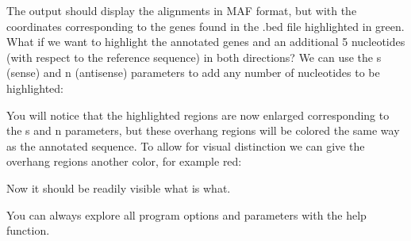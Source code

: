 \documentclass[letterpaper,10pt,english]{sphinxmanual}
\begin{document}
\begin{sphinxVerbatim}[commandchars=\\\{\}]
\end{sphinxVerbatim}

\sphinxAtStartPar
The output should display the alignments in MAF format, but with the coordinates corresponding to
the genes found in the .bed file highlighted in green. What if we want to highlight the
annotated genes \sphinxhyphen{}and\sphinxhyphen{} an additional 5 nucleotides (with respect to the reference sequence)
in both directions? We can use the \sphinxhyphen{}s (\textendash{}sense) and \sphinxhyphen{}n (\textendash{}antisense) parameters to add any
number of nucleotides to be highlighted:

\begin{sphinxVerbatim}[commandchars=\\\{\}]
\end{sphinxVerbatim}

\sphinxAtStartPar
You will notice that the highlighted regions are now enlarged corresponding to the \sphinxhyphen{}s and \sphinxhyphen{}n
parameters, but these overhang regions will be colored the same way as the annotated sequence.
To allow for visual distinction we can give the overhang regions another color, for example red:

\begin{sphinxVerbatim}[commandchars=\\\{\}]
\end{sphinxVerbatim}

\sphinxAtStartPar
Now it should be readily visible what is what.

\sphinxAtStartPar
You can always explore all program options and parameters with the \textendash{}help function.



\renewcommand{\indexname}{Index}
\printindex
\end{document}
